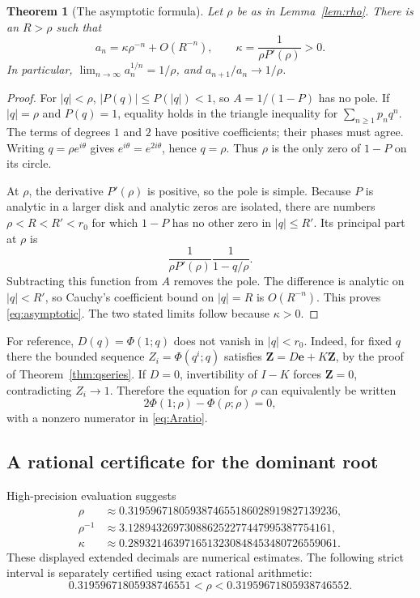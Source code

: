 \documentclass[11pt,letterpaper]{article}
\numberwithin{equation}{section}
\newtheorem{theorem}{Theorem}[section]
\theoremstyle{definition}
\begin{document}
\begin{theorem}[The asymptotic formula]
\label{thm:asymptotic}
Let $\rho$ be as in Lemma~\ref{lem:rho}. There is an $R>\rho$ such that
\begin{equation}
 a_n=\kappa\rho^{-n}+O(R^{-n}),\qquad
 \kappa=\frac{1}{\rho P'(\rho)}>0.
 \label{eq:asymptotic}
\end{equation}
In particular, $\lim_{n\to\infty}a_n^{1/n}=1/\rho$, and
$a_{n+1}/a_n\to1/\rho$.
\end{theorem}
\begin{proof}
For $|q|<\rho$,
$|P(q)|\le P(|q|)<1$, so $A=1/(1-P)$ has no pole. If $|q|=\rho$ and
$P(q)=1$, equality holds in the triangle inequality for
$\sum_{n\ge1}p_nq^n$. The terms of degrees $1$ and $2$ have positive
coefficients; their phases must agree. Writing $q=\rho e^{i\theta}$ gives
$e^{i\theta}=e^{2i\theta}$, hence $q=\rho$. Thus $\rho$ is the only zero
of $1-P$ on its circle.

At $\rho$, the derivative $P'(\rho)$ is positive, so the pole is simple.
Because $P$ is analytic in a larger disk and analytic zeros are isolated,
there are numbers $\rho<R<R'<r_0$ for which $1-P$ has no other zero in
$|q|\le R'$. Its principal part at $\rho$ is
\[
 \frac{1}{\rho P'(\rho)}\frac{1}{1-q/\rho}.
\]
Subtracting this function from $A$ removes the pole. The difference is
analytic on $|q|<R'$, so Cauchy's coefficient bound on $|q|=R$ is
$O(R^{-n})$. This proves \eqref{eq:asymptotic}. The two stated limits
follow because $\kappa>0$.
\end{proof}

For reference, $D(q)=\Phi(1;q)$ does not vanish in $|q|<r_0$. Indeed, for
fixed $q$ there the bounded sequence $Z_i=\Phi(q^i;q)$ satisfies
$\mathbf Z=D\mathbf e+K\mathbf Z$, by the proof of
Theorem~\ref{thm:qseries}. If $D=0$, invertibility of $I-K$ forces
$\mathbf Z=0$, contradicting $Z_i\to1$. Therefore the equation for $\rho$
can equivalently be written
\begin{equation}
 2\Phi(1;\rho)-\Phi(\rho;\rho)=0,
 \label{eq:rootqseries}
\end{equation}
with a nonzero numerator in \eqref{eq:Aratio}.

\subsection{A rational certificate for the dominant root}
High-precision evaluation suggests
\begin{align}
 \rho&\approx0.3195967180593874655186028919827139236,\label{eq:rhonum}\\
 \rho^{-1}&\approx3.128943269730886252277447995387754161,\label{eq:growthnum}\\
 \kappa&\approx0.2893214639716513230848453480726559061.
 \label{eq:kappanum}
\end{align}
These displayed extended decimals are numerical estimates. The following
strict interval is separately certified using exact rational arithmetic:
\begin{equation}
 \boxed{\quad
 0.31959671805938746551<\rho<0.31959671805938746552.
 \quad}
 \label{eq:rootinterval}
\end{equation}
\end{document}
